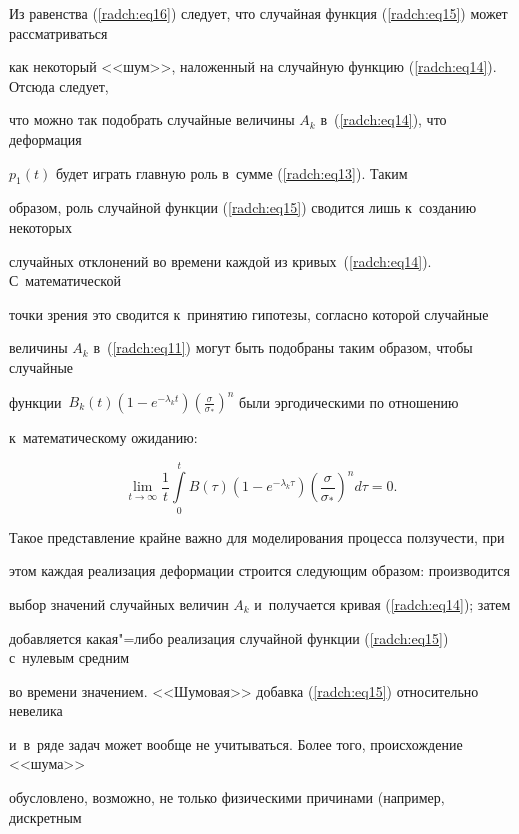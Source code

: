 Из равенства (\ref{radch:eq16}) следует, что случайная функция (\ref{radch:eq15}) может рассматриваться 

как некоторый <<шум>>, наложенный на случайную функцию (\ref{radch:eq14}). Отсюда следует, 

что можно так подобрать случайные величины $A_k $ в~(\ref{radch:eq14}), что деформация 

$p_1 \left( t \right)$ будет играть главную роль в~сумме (\ref{radch:eq13}). Таким 

образом, роль случайной функции (\ref{radch:eq15}) сводится лишь к~созданию некоторых 

случайных отклонений во времени каждой из кривых~(\ref{radch:eq14}). С~математической 

точки зрения это сводится к~принятию гипотезы, согласно которой случайные 

величины $A_k $ в~(\ref{radch:eq11}) могут быть подобраны таким образом, чтобы случайные 

функции~$B_k \left( t \right)\left( {1 - e^{ - \lambda _k t}} \right)\left( 

{\frac{\sigma }{\sigma _ * }} \right)^n$ были эргодическими по отношению 

к~математическому ожиданию:

\[

\lim \limits_{t \to \infty } \frac{1}{t}\int\limits_0^t {B\left( 

\tau \right)} \left( {1 - e^{ - \lambda _k \tau }} \right)\left( 

{\frac{\sigma }{\sigma _ * }} \right)^nd\tau = 0.

\]



Такое представление крайне важно для моделирования процесса ползучести, при 

этом каждая реализация деформации строится следующим образом: производится 

выбор значений случайных величин $A_k $ и~получается кривая (\ref{radch:eq14}); затем 

добавляется какая"=либо реализация случайной функции (\ref{radch:eq15}) с~нулевым средним 

во времени значением. <<Шумовая>> добавка (\ref{radch:eq15}) относительно невелика 

и~в~ряде задач может вообще не учитываться. Более того, происхождение <<шума>> 

обусловлено, возможно, не только физическими причинами (например, дискретным 


